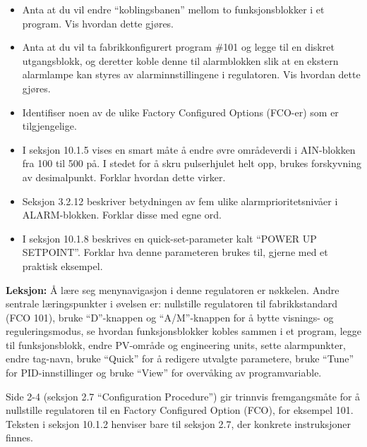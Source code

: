 \begin{itemize}
\item{} Anta at du vil endre ``koblingsbanen'' mellom to funksjonsblokker i et program. Vis hvordan dette gjøres.
\item{} Anta at du vil ta fabrikkonfigurert program \#101 og legge til en diskret utgangsblokk, og deretter koble denne til alarmblokken slik at en ekstern alarmlampe kan styres av alarminnstillingene i regulatoren. Vis hvordan dette gjøres.
\item{} Identifiser noen av de ulike Factory Configured Options (FCO-er) som er tilgjengelige.
\item{} I seksjon 10.1.5 vises en smart måte å endre øvre områdeverdi i AIN-blokken fra 100 til 500 på. I stedet for å skru pulserhjulet helt opp, brukes forskyvning av desimalpunkt. Forklar hvordan dette virker.
\item{} Seksjon 3.2.12 beskriver betydningen av fem ulike alarmprioritetsnivåer i ALARM-blokken. Forklar disse med egne ord.
\item{} I seksjon 10.1.8 beskrives en quick-set-parameter kalt ``POWER UP SETPOINT''. Forklar hva denne parameteren brukes til, gjerne med et praktisk eksempel.
\end{itemize}














{\bf Leksjon:} Å lære seg menynavigasjon i denne regulatoren er nøkkelen. Andre sentrale læringspunkter i øvelsen er: nullstille regulatoren til fabrikkstandard (FCO 101), bruke ``D''-knappen og ``A/M''-knappen for å bytte visnings- og reguleringsmodus, se hvordan funksjonsblokker kobles sammen i et program, legge til funksjonsblokk, endre PV-område og engineering units, sette alarmpunkter, endre tag-navn, bruke ``Quick'' for å redigere utvalgte parametere, bruke ``Tune'' for PID-innstillinger og bruke ``View'' for overvåking av programvariable.

\vskip 10pt

Side 2-4 (seksjon 2.7 ``Configuration Procedure'') gir trinnvis fremgangsmåte for å nullstille regulatoren til en Factory Configured Option (FCO), for eksempel 101. Teksten i seksjon 10.1.2 henviser bare til seksjon 2.7, der konkrete instruksjoner finnes.

